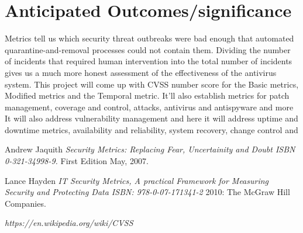 \documentclass{article}
\begin{document}
\section{Anticipated Outcomes/significance} Metrics tell us
which security threat outbreaks were bad enough that automated quarantine-and-removal
processes could not contain them. Dividing the number of incidents that required
human intervention into the total number of incidents gives us a much more honest
assessment of the effectiveness of the antivirus system. \linebreak
This project will come up with CVSS number score for the Basic metrics, Modified metrics and the Temporal metric. It’ll also establish metrics for patch management, coverage and control, attacks, antivirus and antispyware and more
It will also address vulnerability management and here it will address uptime and downtime metrics, availability and reliability, system recovery, change control and 

 \begin{thebibliography}{1}

   Andrew Jaquith {\em Security Metrics: Replacing Fear, Uncertainity and Doubt
 ISBN 0-321-34998-9.} First Edition May, 2007.

    Lance Hayden {\em IT Security Metrics, A practical Framework for Measuring Security and Protecting Data ISBN: 978-0-07-171341-2} 2010:
  The McGraw Hill Companies.

    {\em https://en.wikipedia.org/wiki/CVSS

} 

  \end{thebibliography}
\end{document}
